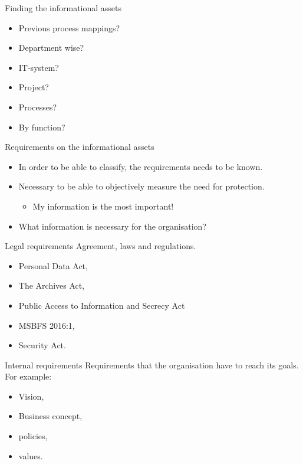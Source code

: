 \documentclass{beamer}
\begin{document}
\begin{frame}{Finding the informational assets}
  \begin{itemize}
    \item Previous process mappings?
    \item Department wise?
    \item IT-system?
    \item Project?
    \item Processes?
    \item By function?
  \end{itemize}
\end{frame}

\begin{frame}{Requirements on the informational assets}
  \begin{itemize}
    \item In order to be able to classify, the requirements needs to be known.

    \item Necessary to be able to objectively measure the need for protection.
      \begin{itemize}
        \item My information is the most important!
      \end{itemize}

    \item What information is necessary for the organisation?

  \end{itemize}
\end{frame}

\begin{frame}{Legal requirements}
  Agreement, laws and regulations.
  \begin{itemize}
    \item Personal Data Act,
    \item The Archives Act,
    \item Public Access to Information and Secrecy Act
    \item MSBFS 2016:1,
    \item Security Act.
  \end{itemize}
\end{frame}

\begin{frame}{Internal requirements}
  Requirements that the organisation have to reach its goals.
  For example:
  \begin{itemize}
    \item Vision,
    \item Business concept,
    \item policies,
    \item values.
  \end{itemize}
\end{frame}
\end{document}
